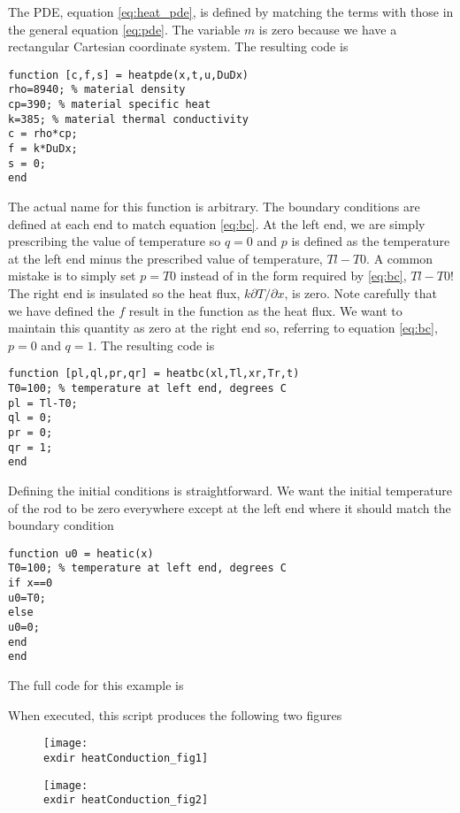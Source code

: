 \documentclass{article}
\begin{document}
The PDE, equation \eqref{eq:heat_pde}, is defined by matching the terms with
those in the general equation \eqref{eq:pde}. The variable $m$ is zero because
we have a rectangular Cartesian coordinate system. The resulting code is
\begin{lstlisting}
function [c,f,s] = heatpde(x,t,u,DuDx)
rho=8940; % material density
cp=390; % material specific heat
k=385; % material thermal conductivity 
c = rho*cp;
f = k*DuDx;
s = 0;
end
\end{lstlisting}
The actual name for this function is arbitrary. 
The boundary conditions are defined at each end to match equation \eqref{eq:bc}. 
At the left end, we are simply prescribing the value of temperature so $q=0$ and
$p$ is defined as the temperature at the left end minus the prescribed value of
temperature, $Tl-T0$. A common mistake is to simply set $p=T0$ instead of in
the form required by \eqref{eq:bc}, $Tl-T0$! The right end is insulated so the
heat flux, $k\partial T/\partial x$, is zero. Note carefully that we have defined
the $f$ result in the  function as the heat flux. We want \pde to
maintain this quantity as zero at the right end so, referring to equation \eqref{eq:bc}, $p=0$ and $q=1$. The resulting code is
\begin{lstlisting}
function [pl,ql,pr,qr] = heatbc(xl,Tl,xr,Tr,t)
T0=100; % temperature at left end, degrees C
pl = Tl-T0;
ql = 0;
pr = 0;
qr = 1;
end
\end{lstlisting}
Defining the initial conditions is straightforward. We want the initial temperature
of the rod to be zero everywhere except at the left end where it should match the
boundary condition
\begin{lstlisting}
function u0 = heatic(x)
T0=100; % temperature at left end, degrees C
if x==0
u0=T0;
else
u0=0;
end
end
\end{lstlisting}	

\vspace{5mm}
The full code for this example is 

\begin{comment}
\newpage
\subsection{Solving a System of PDE}
\end{comment}

When executed, this script produces the following two figures
\begin{figure}[ht]
	\centering
	\texttt{[image: \\exdir heatConduction\_fig1]}
	\label{fig:heatConduction_fig1}
\end{figure}
\begin{figure}[ht]
	\centering
	\texttt{[image: \\exdir heatConduction\_fig2]}
	\label{fig:heatConduction_fig2}
\end{figure}
\end{document}
